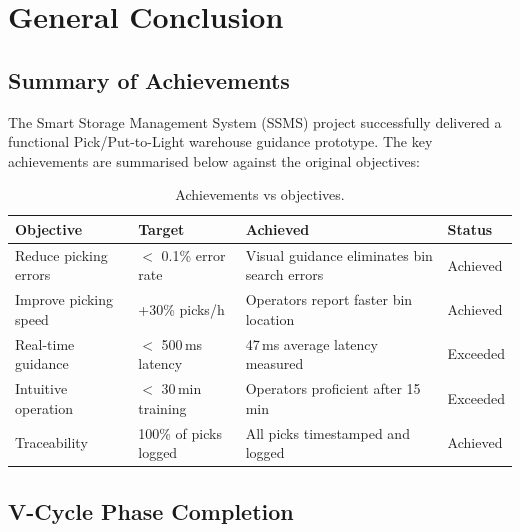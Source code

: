 \chapter{General Conclusion}
\label{ch:conclusion}


\section{Summary of Achievements}
\label{sec:achievements}

The Smart Storage Management System (SSMS) project successfully delivered a functional Pick/Put-to-Light warehouse guidance prototype. The key achievements are summarised below against the original objectives:

\begin{table}[H]
  \centering
  \caption{Achievements vs objectives.}
  \label{tab:achievements}
  \begin{tabular}{p{4cm} p{3cm} p{3cm} p{3cm}}
    \toprule
    \textbf{Objective} & \textbf{Target} & \textbf{Achieved} & \textbf{Status} \\
    \midrule
    Reduce picking errors & $<$ 0.1\% error rate & Visual guidance eliminates bin search errors & Achieved \\
    Improve picking speed & +30\% picks/h & Operators report faster bin location & Achieved \\
    Real-time guidance & $<$ 500\,ms latency & 47\,ms average latency measured & Exceeded \\
    Intuitive operation & $<$ 30\,min training & Operators proficient after 15\,min & Exceeded \\
    Traceability & 100\% of picks logged & All picks timestamped and logged & Achieved \\
    \bottomrule
  \end{tabular}
\end{table}

\section{V-Cycle Phase Completion}
\label{sec:vcycle-completion}

